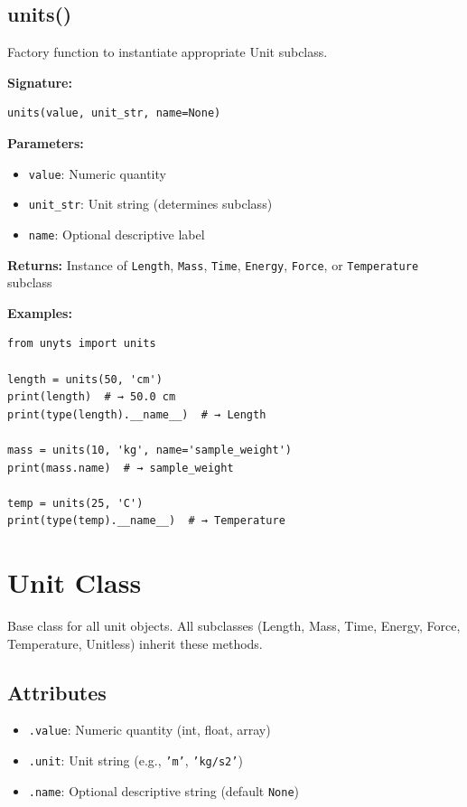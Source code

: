 \documentclass[11pt,a4paper]{report}
\begin{document}
\subsection{units()}

Factory function to instantiate appropriate Unit subclass.

\textbf{Signature:}
\begin{lstlisting}[style=pythonstyle]
units(value, unit_str, name=None)
\end{lstlisting}

\textbf{Parameters:}
\begin{itemize}
\item \texttt{value}: Numeric quantity
\item \texttt{unit\_str}: Unit string (determines subclass)
\item \texttt{name}: Optional descriptive label
\end{itemize}

\textbf{Returns:} Instance of \texttt{Length}, \texttt{Mass}, \texttt{Time}, \texttt{Energy}, \texttt{Force}, or \texttt{Temperature} subclass

\textbf{Examples:}
\begin{lstlisting}[style=pythonstyle]
from unyts import units

length = units(50, 'cm')
print(length)  # → 50.0 cm
print(type(length).__name__)  # → Length

mass = units(10, 'kg', name='sample_weight')
print(mass.name)  # → sample_weight

temp = units(25, 'C')
print(type(temp).__name__)  # → Temperature
\end{lstlisting}

\section{Unit Class}

Base class for all unit objects. All subclasses (Length, Mass, Time, Energy, Force, Temperature, Unitless) inherit these methods.

\subsection{Attributes}

\begin{itemize}
\item \texttt{.value}: Numeric quantity (int, float, array)
\item \texttt{.unit}: Unit string (e.g., \texttt{'m'}, \texttt{'kg/s2'})
\item \texttt{.name}: Optional descriptive string (default \texttt{None})
\end{itemize}
\end{document}
